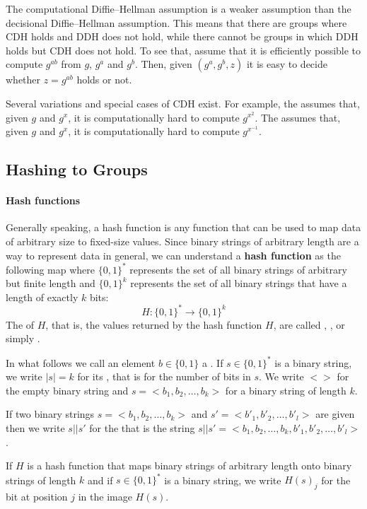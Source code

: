 The computational Diffie--Hellman assumption is a weaker assumption than the decisional  Diffie--Hellman assumption. This means that there are groups where CDH holds and DDH does not hold, while there cannot be groups in which DDH holds but CDH does not hold. To see that, assume that it is efficiently possible to compute $g^{ab}$ from $g$, $g^a$ and $g^b$. Then, given $(g^a,g^b,z)$ it is easy to decide whether $z=g^{ab}$ holds or not.

Several variations and special cases of CDH exist. For example, the  assumes that, given $g$ and $g^x$, it is computationally hard to compute $g^{x^2}$. The  assumes that, given $g$ and $g^x$, it is computationally hard to compute $g^{x^{-1}}$.

\subsection{Hashing to Groups}\label{sec:hashing-to-groups}
\paragraph{Hash functions} Generally speaking, a hash function is any function that can be used to map data of arbitrary size to fixed-size values. Since binary strings of arbitrary length are a way to represent data in general, we can understand a \textbf{hash function} as the following map where $\{0,1\}^*$ represents the set of all binary strings of arbitrary but finite length and $\{0,1\}^k$ represents the set of all binary strings that have a length of exactly $k$ bits:
\begin{equation}
\label{def:hash_function}
H: \{0,1\}^* \to \{0,1\}^k
\end{equation}
The  of $H$, that is, the values returned by the hash function $H$, are called , , or simply .

\begin{notation}
\label{string_and_hash_notations}
In what follows we call an element $b\in\{0,1\}$ a . If $s\in\{0,1\}^*$ is a binary string, we write $|s|=k$ for its , that is for the number of bits in $s$. We write $<>$ for the empty binary string and $s=<b_1,b_2,\ldots,b_k>$ for a binary string of length $k$.

If two binary strings $s=<b_1,b_2,\ldots,b_k>$ and $s'=<b'_1,b'_2,\ldots,b'_l>$ are given then we write $s||s'$ for the  that is the string 
$s||s'=<b_1,b_2,\ldots,b_k,b'_1,b'_2,\ldots,b'_l>$.

If $H$ is a hash function that maps binary strings of arbitrary length onto binary strings of length $k$ and if $s\in\{0,1\}^*$ is a binary string, we write $H(s)_j$ for the bit at position $j$ in the image $H(s)$.
\end{notation}


